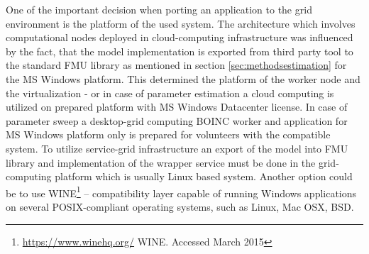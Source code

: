 One of the important decision when porting an application to the grid environment is the platform of the used system. The architecture which involves computational nodes deployed in cloud-computing infrastructure was influenced by the fact, that the model implementation is exported from third party tool to the standard FMU library as mentioned in section \ref{sec:methodsestimation} for the MS Windows platform. This determined the platform of the worker node and the virtualization - or in case of parameter estimation a cloud computing is utilized on prepared platform with MS Windows Datacenter license. In case of parameter sweep a desktop-grid computing BOINC worker and application for MS Windows platform only is prepared for volunteers with the compatible system. To utilize service-grid infrastructure an export of the model into FMU library and implementation of the wrapper service must be done in the grid-computing platform which is usually Linux based system. Another option could be to use WINE\footnote{\url{https://www.winehq.org/} WINE. Accessed March 2015} -- compatibility layer capable of running Windows applications on several POSIX-compliant operating systems, such as Linux, Mac OSX, BSD. 



